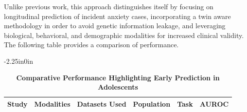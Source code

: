 \documentclass[10pt,letterpaper]{article}
\begin{document}
                                                                                                                         Unlike previous work, this approach distinguishes itself by focusing on longitudinal prediction of incident anxiety cases, incorporating a twin aware methodology in order to avoid genetic information leakage, and leveraging biological, behavioral, and demographic modalities for increased clinical validity. The following table provides a comparison of performance.

                                                                                                                          \begin{table}[!t]
                                                                                                                          \begin{adjustwidth}{-2.25in}{0in}
                                                                                                                          \centering
                                                                                                                          \caption{\textbf{Comparative Performance Highlighting Early Prediction in Adolescents}}
                                                                                                                          \label{tab:performance_comparison}
                                                                                                                          \footnotesize
                                                                                                                          \renewcommand{\arraystretch}{1.15}

                                                                                                                          \begin{tabular}{|p{3.0cm}|p{2.4cm}|p{3.6cm}|p{2.0cm}|p{2.0cm}|p{2.4cm}|}
                                                                                                                          \hline
                                                                                                                          \textbf{Study} & \textbf{Modalities} & \textbf{Datasets Used} & \textbf{Population} & \textbf{Task} & \textbf{AUROC} \\
                                                                                                                          \hline


\end{tabular}
\end{adjustwidth}
\end{table}
\end{document}
